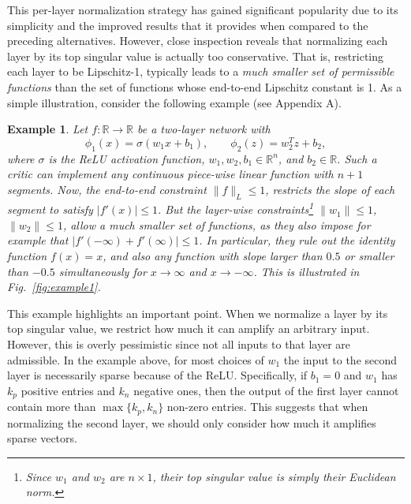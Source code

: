 \documentclass[letterpaper]{article} %
\newtheorem{example}{Example}
\begin{document}
This per-layer normalization strategy has gained significant popularity due to its simplicity and the improved results that it provides when compared to the preceding alternatives. However, close inspection reveals that normalizing each layer by its top singular value is actually too conservative. That is, restricting each layer to be Lipschitz-1, typically leads to a \emph{much smaller set of permissible functions} than the set of functions whose end-to-end Lipschitz constant is 1. As a simple illustration, consider the following example (see Appendix A).
\begin{example}
	Let $f:\mathbb{R}\rightarrow\mathbb{R}$ be a two-layer network with
	\begin{equation}
	\phi_1(x)= \sigma(w_1 x + b_1),\qquad \phi_2(z)= w_2^T z + b_2,
	\end{equation}
 where $\sigma$ is the ReLU activation function, $w_1,w_2,b_1\in\mathbb{R}^n$, and $b_2\in\mathbb{R}$.
	Such a critic can implement any continuous piece-wise linear function with $n+1$ segments. Now, the end-to-end constraint $\|f\|_L\leq 1$, restricts the slope of each segment to satisfy $|f'(x)|\leq 1$. But the layer-wise constraints\footnote{Since $w_1$ and $w_2$ are $n\times 1$, their top singular value is simply their Euclidean norm.} $\|w_1\|\leq 1$, $\|w_2\|\leq 1$, allow a much smaller set of functions, as they also impose for example that $|f'(-\infty)+f'(\infty)|\leq 1$. In particular, they rule out the identity function $f(x)=x$, and also any function with slope larger than $0.5$ or smaller than $-0.5$ simultaneously for $x\rightarrow\infty$ and $x\rightarrow-\infty$. This is illustrated in Fig.~\ref{fig:example1}.
\end{example}


This example highlights an important point. When we normalize a layer by its top singular value, we restrict how much it can amplify an arbitrary input. However, this is overly pessimistic since not all inputs to that layer are admissible. In the example above, for most choices of $w_1$ the input to the second layer is necessarily sparse because of the ReLU. Specifically, if $b_1=0$ and $w_1$ has $k_p$ positive entries and $k_n$ negative ones, then the output of the first layer cannot contain more than $\max\{k_p,k_n\}$ non-zero entries. This suggests that when normalizing the second layer, we should only consider how much it amplifies sparse vectors.
\end{document}
